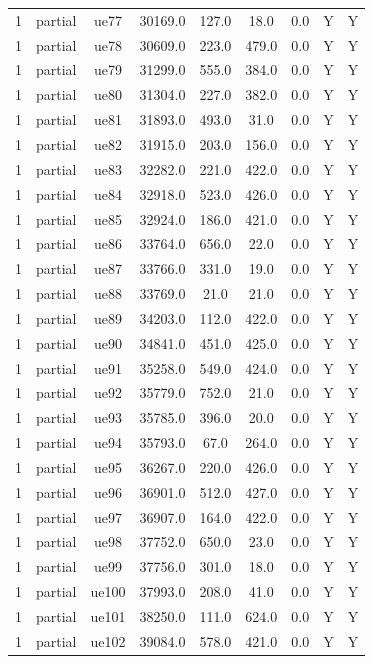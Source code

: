 \begin{table}[ht]
\begin{tabular}{|c|c|c|c|c|c|c|c|c|}
1 & partial & ue77 & 30169.0 & 127.0 & 18.0 & 0.0 & Y & Y \\
1 & partial & ue78 & 30609.0 & 223.0 & 479.0 & 0.0 & Y & Y \\
1 & partial & ue79 & 31299.0 & 555.0 & 384.0 & 0.0 & Y & Y \\
1 & partial & ue80 & 31304.0 & 227.0 & 382.0 & 0.0 & Y & Y \\
1 & partial & ue81 & 31893.0 & 493.0 & 31.0 & 0.0 & Y & Y \\
1 & partial & ue82 & 31915.0 & 203.0 & 156.0 & 0.0 & Y & Y \\
1 & partial & ue83 & 32282.0 & 221.0 & 422.0 & 0.0 & Y & Y \\
1 & partial & ue84 & 32918.0 & 523.0 & 426.0 & 0.0 & Y & Y \\
1 & partial & ue85 & 32924.0 & 186.0 & 421.0 & 0.0 & Y & Y \\
1 & partial & ue86 & 33764.0 & 656.0 & 22.0 & 0.0 & Y & Y \\
1 & partial & ue87 & 33766.0 & 331.0 & 19.0 & 0.0 & Y & Y \\
1 & partial & ue88 & 33769.0 & 21.0 & 21.0 & 0.0 & Y & Y \\
1 & partial & ue89 & 34203.0 & 112.0 & 422.0 & 0.0 & Y & Y \\
1 & partial & ue90 & 34841.0 & 451.0 & 425.0 & 0.0 & Y & Y \\
1 & partial & ue91 & 35258.0 & 549.0 & 424.0 & 0.0 & Y & Y \\
1 & partial & ue92 & 35779.0 & 752.0 & 21.0 & 0.0 & Y & Y \\
1 & partial & ue93 & 35785.0 & 396.0 & 20.0 & 0.0 & Y & Y \\
1 & partial & ue94 & 35793.0 & 67.0 & 264.0 & 0.0 & Y & Y \\
1 & partial & ue95 & 36267.0 & 220.0 & 426.0 & 0.0 & Y & Y \\
1 & partial & ue96 & 36901.0 & 512.0 & 427.0 & 0.0 & Y & Y \\
1 & partial & ue97 & 36907.0 & 164.0 & 422.0 & 0.0 & Y & Y \\
1 & partial & ue98 & 37752.0 & 650.0 & 23.0 & 0.0 & Y & Y \\
1 & partial & ue99 & 37756.0 & 301.0 & 18.0 & 0.0 & Y & Y \\
1 & partial & ue100 & 37993.0 & 208.0 & 41.0 & 0.0 & Y & Y \\
1 & partial & ue101 & 38250.0 & 111.0 & 624.0 & 0.0 & Y & Y \\
1 & partial & ue102 & 39084.0 & 578.0 & 421.0 & 0.0 & Y & Y \\

\end{tabular}
\end{table}
